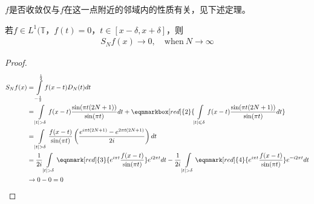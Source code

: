 \begin{remark}
    $f$是否收敛仅与$f$在这一点附近的邻域内的性质有关，见下述定理。
\end{remark}

\begin{theorem}[Riemann局部化]
    若$f\in L^1(\mathbb{T}$，$f(t)=0$，$t\in[x-\delta,x+\delta]$，则
    \begin{align*}
        S_N f(x) \to 0,\quad \text{when}\ N\to \infty
    \end{align*}
\end{theorem}
\begin{proof}
    \begin{align*}
        S_N f(x) &= \int\limits_{-\frac{1}{2}}^{\frac{1}{2}} f(x-t) D_N(t) dt \\
        &= \int\limits_{|t|>\delta} f(x-t) \frac{\sin(\pi t(2N+1))}{\sin(\pi t)} dt + \eqnmarkbox[red]{2}{\int\limits_{|t|\leqslant\delta} f(x-t) \frac{\sin(\pi t(2N+1))}{\sin(\pi t)} dt} \\
        & = \int\limits_{|t|>\delta} \frac{f(x-t)}{\sin(\pi t)} \left(\frac{e^{i\pi t(2N+1)} - e^{{2\pi t(2N+1)}}}{2i}\right) dt \\
        & = \frac{1}{2i} \int\limits_{|t|>\delta} \eqnmark[red]{3}{e^{i\pi t} \frac{f(x-t)}{\sin(\pi t)}} e^{i2\pi t} dt - \frac{1}{2i} \int\limits_{|t|>\delta} \eqnmark[red]{4}{e^{i\pi t} \frac{f(x-t)}{\sin(\pi t)}} e^{-i2\pi t} dt \\
        & \to 0 - 0 = 0
    \end{align*}
\end{proof}



